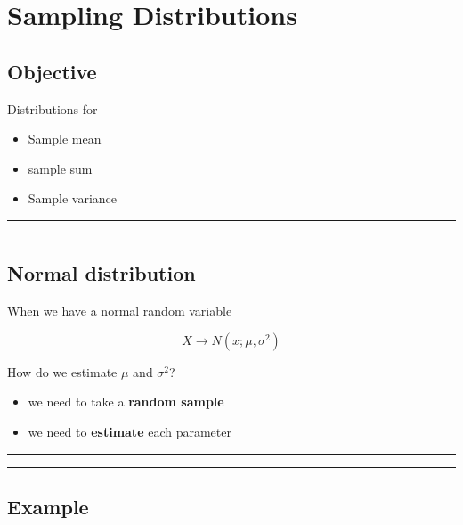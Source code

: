 \documentclass[
]{book}
\providecommand{\tightlist}{%
  \setlength{\itemsep}{0pt}\setlength{\parskip}{0pt}}
\begin{document}
\hypertarget{sampling-distributions}{%
\chapter{Sampling Distributions}\label{sampling-distributions}}

\hypertarget{objective-8}{%
\section{Objective}\label{objective-8}}

Distributions for

\begin{itemize}
\tightlist
\item
  Sample mean
\item
  sample sum
\item
  Sample variance
\end{itemize}

\begin{center}\rule{0.5\linewidth}{0.5pt}\end{center}

\begin{center}\rule{0.5\linewidth}{0.5pt}\end{center}

\hypertarget{normal-distribution-8}{%
\section{Normal distribution}\label{normal-distribution-8}}

When we have a normal random variable

\[X \rightarrow N(x; \mu, \sigma^2)\]

How do we estimate \(\mu\) and \(\sigma^2\)?

\begin{itemize}
\item
  we need to take a \textbf{random sample}
\item
  we need to \textbf{estimate} each parameter
\end{itemize}

\begin{center}\rule{0.5\linewidth}{0.5pt}\end{center}

\begin{center}\rule{0.5\linewidth}{0.5pt}\end{center}

\hypertarget{example-12}{%
\section{Example}\label{example-12}}
\end{document}

